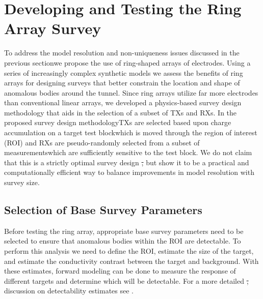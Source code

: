 \documentclass[preprint,authoryear,12pt]{elsarticle}
\providecommand{\DIFaddtex}[1]{{\protect\color{blue}\uwave{#1}}} %
\providecommand{\DIFdeltex}[1]{{\protect\color{red}\sout{#1}}}                      %
\providecommand{\DIFaddbegin}{} %
\providecommand{\DIFaddend}{} %
\providecommand{\DIFdelbegin}{} %
\providecommand{\DIFdelend}{} %
\providecommand{\DIFadd}[1]{\texorpdfstring{\DIFaddtex{#1}}{#1}} %
\providecommand{\DIFdel}[1]{\texorpdfstring{\DIFdeltex{#1}}{}} %
\begin{document}
\section{Developing and Testing the Ring Array Survey}
\label{sec:RingArray_Development}

To address the model resolution and non-uniqueness issues discussed in the previous section\DIFaddbegin \DIFadd{, }\DIFaddend we propose the use of ring-shaped arrays of electrodes. Using a series of increasingly complex synthetic models we assess the benefits of ring arrays for designing surveys that better constrain the location and shape of anomalous bodies around the tunnel. Since ring arrays utilize far more electrodes than conventional linear arrays, we developed a physics-based survey design methodology that aids in the selection of a subset of TXs and RXs. In the proposed survey design methodology\DIFaddbegin \DIFadd{, }\DIFaddend TXs are selected based upon charge accumulation on a target test block\DIFaddbegin \DIFadd{, }\DIFaddend which is moved through the region of interest (ROI) and RXs are pseudo-randomly selected from a subset of measurements\DIFaddbegin \DIFadd{, }\DIFaddend which are sufficiently sensitive to the test block. We do not claim that this is a strictly optimal survey design \DIFdelbegin \DIFdel{, }\DIFdelend but show it to be a practical and computationally efficient way to balance improvements in model resolution with survey size.

\subsection{Selection of Base Survey Parameters}
\label{sec:RingArray_Development_BaseSurveyParams}

Before testing the ring array, appropriate base survey parameters need to be selected to ensure that anomalous bodies within the ROI are detectable. To perform this analysis we need to define the ROI, estimate the size of the target, and estimate the conductivity contrast between the target and background. With these estimates, forward modeling can be done to measure the response of different targets and determine which will be detectable. For a more detailed \DIFdelbegin \DIFdel{, }\DIFdelend discussion on detectability estimates see \citet{Mitchell2020}.
\end{document}
